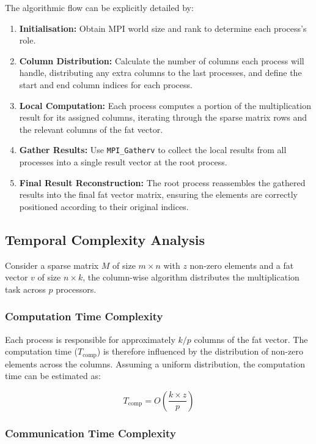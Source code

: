 \documentclass[12pt,oneside]{book} %
\begin{document}
The algorithmic flow can be explicitly detailed by:
\begin{enumerate}
    \item \textbf{Initialisation:}  Obtain MPI world size and rank to determine each process's role.
    \item \textbf{Column Distribution:} Calculate the number of columns each process will handle, distributing any extra columns to the last processes, and define the start and end column indices for each process.
    \item \textbf{Local Computation:} Each process computes a portion of the multiplication result for its assigned columns, iterating through the sparse matrix rows and the relevant columns of the fat vector.
    \item \textbf{Gather Results:} Use \texttt{MPI\_Gatherv} to collect the local results from all processes into a single result vector at the root process.
    \item \textbf{Final Result Reconstruction:} The root process reassembles the gathered results into the final fat vector matrix, ensuring the elements are correctly positioned according to their original indices.
\end{enumerate}

\subsection{Temporal Complexity Analysis}
Consider a sparse matrix $M$ of size $m \times n$ with $z$ non-zero elements
and a fat vector $v$ of size $n \times k$, the column-wise algorithm
distributes the multiplication task across $p$ processors.

\subsubsection{Computation Time Complexity}
Each process is responsible for approximately \(k/p\) columns of the fat
vector. The computation time (\(T_{\text{comp}}\)) is therefore influenced by
the distribution of non-zero elements across the columns. Assuming a uniform
distribution, the computation time can be estimated as:

\begin{equation}
    T_{\text{comp}} = O\left(\frac{k \times z}{p}\right)
\end{equation}

\subsubsection{Communication Time Complexity}
\end{document}
